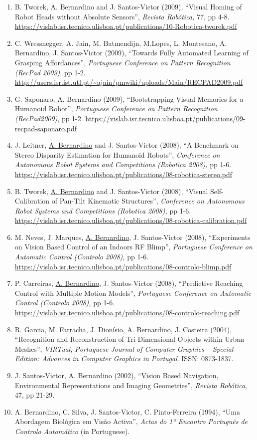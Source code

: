 \documentclass[
]{article}
\begin{document}
\begin{enumerate}
{  on Pattern Recognition (RecPad 2010)}, pp 1-2.
  \url{https://vislab.isr.tecnico.ulisboa.pt/publications/10-RecPad-RGalego.pdf}
\item
  B. Tworek, A. Bernardino and J. Santos-Victor (2009), ``Visual Homing
  of Robot Heads without Absolute Sensors'', \emph{Revista Robótica,}
  77, pp 4-8.
  \url{https://vislab.isr.tecnico.ulisboa.pt/publications/10-Robotica-tworek.pdf}
\item
  C. Wressnegger, A. Jain, M. Batmendijn, M.Lopes, L. Montesano, A.
  Bernardino, J. Santos-Victor (2009), ``Towards Fully Automated
  Learning of Grasping Affordances'', \emph{Portuguese Conference on
  Pattern Recognition (RecPad 2009)}, pp 1-2.
  \url{http://users.isr.ist.utl.pt/~ajain/pmwiki/uploads/Main/RECPAD2009.pdf}
\item
  G. Saponaro, A. Bernardino (2009), ``Bootstrapping Visual Memories for
  a Humanoid Robot'', \emph{Portuguese Conference on Pattern Recognition
  (RecPad2009)}, pp 1-2.
  \url{https://vislab.isr.tecnico.ulisboa.pt/publications/09-recpad-saponaro.pdf}
\item
  J. Leitner, \ul{A. Bernardino} and J. Santos-Victor (2008), ``A
  Benchmark on Stereo Disparity Estimation for Humanoid Robots'',
  \emph{Conference on Autonomous Robot Systems and Competitions
  (Robotica 2008),} pp 1-6.
  \url{https://vislab.isr.tecnico.ulisboa.pt/publications/08-robotica-stereo.pdf}~
\item
  B. Tworek, \ul{A. Bernardino} and J. Santos-Victor (2008), ``Visual
  Self-Calibration of Pan-Tilt Kinematic Structures'', \emph{Conference
  on Autonomous Robot Systems and Competitions (Robotica 2008),} pp 1-6.
  \url{https://vislab.isr.tecnico.ulisboa.pt/publications/08-robotica-calibration.pdf}~
\item
  M. Neves, J. Marques, \ul{A. Bernardino}, J. Santos-Victor (2008),
  ``Experiments on Vision Based Control of an Indoors RF Blimp'',
  \emph{Portuguese Conference on Automatic Control (Controlo 2008),} pp
  1-6.
  \url{https://vislab.isr.tecnico.ulisboa.pt/publications/08-controlo-blimp.pdf}~
\item
  P. Carreiras, \ul{A. Bernardino}, J. Santos-Victor (2008),
  ``Predictive Reaching Control with Multiple Motion Models'',
  \emph{Portuguese Conference on Automatic Control (Controlo 2008),} pp
  1-6.
  \url{https://vislab.isr.tecnico.ulisboa.pt/publications/08-controlo-reaching.pdf}
\item
  R. Garcia, M. Farracha, J. Dionísio, A. Bernardino, J. Costeira
  (2004), ``Recognition and Reconstruction of Tri-Dimensional Objects
  within Urban Meshes'', \emph{VIRTual,} \emph{Portuguese Journal of
  Computer Graphics -- Special Edition: Advances in Computer Graphics in
  Portugal}. ISSN: 0873-1837.
\item
  J. Santos-Victor, A. Bernardino (2002), ``Vision Based Navigation,
  Environmental Representations and Imaging Geometries'', \emph{Revista
  Robótica}, 47, pp 21-29.
\item
  A. Bernardino, C. Silva, J. Santos-Victor, C. Pinto-Ferreira (1994),
  ``Uma Abordagem Biológica em Visão Activa'', \emph{Actas do 1º
  Encontro Português de Controlo Automático} (in Portuguese).
\end{enumerate}
\end{document}
